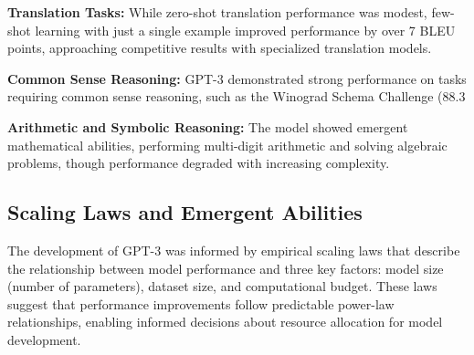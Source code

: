 
\textbf{Translation Tasks:} While zero-shot translation performance was modest, few-shot learning with just a single example improved performance by over 7 BLEU points, approaching competitive results with specialized translation models.

\textbf{Common Sense Reasoning:} GPT-3 demonstrated strong performance on tasks requiring common sense reasoning, such as the Winograd Schema Challenge (88.3%


\textbf{Arithmetic and Symbolic Reasoning:} The model showed emergent mathematical abilities, performing multi-digit arithmetic and solving algebraic problems, though performance degraded with increasing complexity.


\subsection{Scaling Laws and Emergent Abilities}

The development of GPT-3 was informed by empirical scaling laws that describe the relationship between model performance and three key factors: model size (number of parameters), dataset size, and computational budget. These laws suggest that performance improvements follow predictable power-law relationships, enabling informed decisions about resource allocation for model development.


